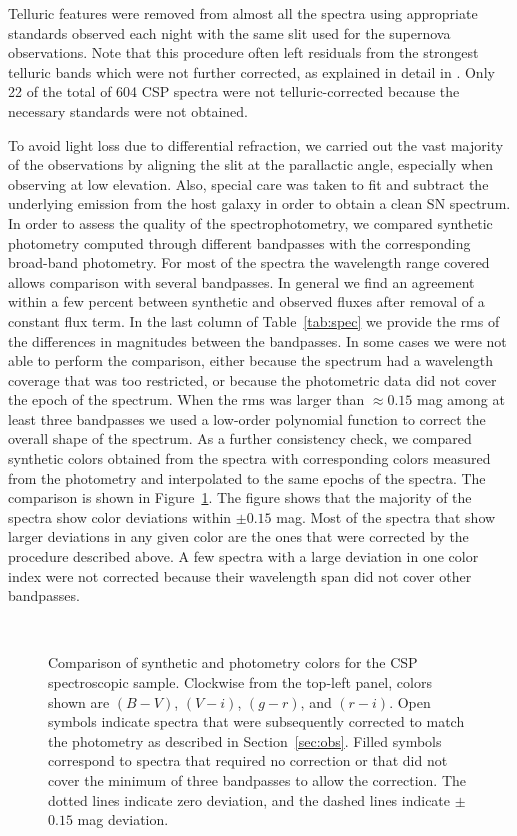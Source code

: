 \documentclass[apj]{emulateapj-rtx4}
\begin{document}
Telluric features were removed from almost all the spectra using 
appropriate standards observed each night with the same slit used for 
the supernova observations. Note that this procedure often left 
residuals from the strongest telluric bands which were not further 
corrected, as explained in detail in \citet{hamuy06}. Only 22 of the 
total of 604 CSP spectra were not telluric-corrected because the
necessary standards were not obtained.

To avoid light loss due to differential refraction, we carried out the
vast majority of the observations by aligning the slit at the
parallactic angle, especially when observing at low elevation. Also,
special care was taken to fit and subtract the underlying emission
from the host galaxy in order to obtain a clean SN spectrum. In order
  to assess the quality of the spectrophotometry, we compared
synthetic photometry computed 
through different bandpasses with the corresponding broad-band
photometry. For most of the spectra 
the wavelength range covered allows comparison with several
bandpasses. In general we find an agreement within a few percent
between synthetic and observed fluxes after removal of a constant flux
term. In the last column of Table~\ref{tab:spec} we provide the rms of
the differences in magnitudes between the bandpasses. In some cases we
were not able to perform the comparison, either because the spectrum
had a wavelength coverage that was too restricted, or because the
photometric data did not cover the epoch of the spectrum. When the rms
was larger than $\approx$$0.15$ mag among at least three
  bandpasses we used a low-order polynomial
function to correct the overall shape of the spectrum. As a
further consistency check, we compared synthetic colors obtained from
the spectra with corresponding colors measured from the photometry and
interpolated to the same epochs of the spectra. The comparison is
shown in Figure~\ref{fig:syncol}. The figure shows that the majority
of the spectra show color deviations within $\pm$$0.15$ mag. Most of
the spectra that show larger deviations in any given color are the
ones that were corrected by the procedure described above. A few
spectra with a large deviation in one color index were not corrected
because their wavelength span did not cover other bandpasses.

\begin{figure}[htpb]%
\\
\caption{Comparison of synthetic and photometry colors for the CSP
  spectroscopic sample. Clockwise from the top-left panel, colors
  shown are $(B-V)$, $(V-i)$, $(g-r)$, and $(r-i)$. Open symbols
  indicate spectra that were subsequently corrected to match the
  photometry as described in Section~\ref{sec:obs}. Filled symbols
  correspond to spectra that required no correction or that did not
  cover the minimum of three bandpasses to allow the correction. The
  dotted lines indicate zero deviation, and the dashed lines indicate
  $\pm$$0.15$ mag deviation.
  \label{fig:syncol}}
\end{figure}
\end{document}
